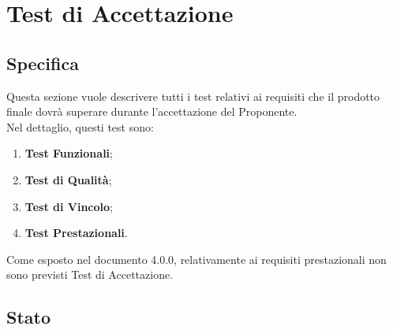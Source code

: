\section{Test di Accettazione}

	\subsection{Specifica}
		Questa sezione vuole descrivere tutti i test relativi ai requisiti che il prodotto finale dovrà superare durante l'accettazione del Proponente.\\
		Nel dettaglio, questi test sono:
		\begin{enumerate}
			\item \textbf{Test Funzionali};
			\item \textbf{Test di Qualità};
			\item \textbf{Test di Vincolo};
			\item \textbf{Test Prestazionali}.
		\end{enumerate}
		Come esposto nel documento \AdR{} 4.0.0, relativamente ai requisiti prestazionali non sono previsti Test di Accettazione. \\
	
	\subsection{Stato}
	
			
			\pagebreak
			
			\pagebreak
			